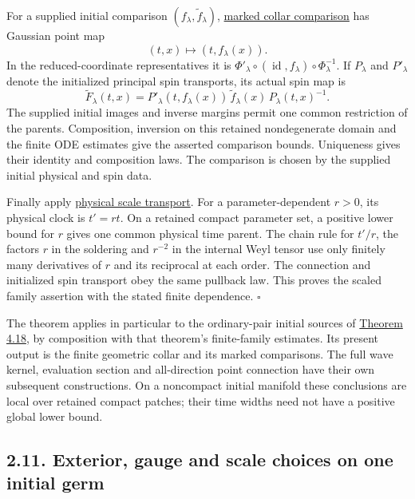 \documentclass[
  english,
  11pt,
  reqno]{amsart}
\begin{document}
For a supplied initial comparison \((f_\lambda,\widetilde f_\lambda)\),
\hyperref[thm:online-marked-collar-full-hom]{marked collar comparison}
has Gaussian point map \[
(t,x)\longmapsto(t,f_\lambda(x)).
\] In the reduced-coordinate representatives it is
\(\Phi'_\lambda\circ(\operatorname{id},f_\lambda)\circ\Phi_\lambda^{-1}\).
If \(P_\lambda\) and \(P'_\lambda\) denote the initialized principal
spin transports, its actual spin map is%
 \[
\widetilde F_\lambda(t,x)
=P'_\lambda(t,f_\lambda(x))\,
\widetilde f_\lambda(x)\,
P_\lambda(t,x)^{-1}.
\] The supplied initial images and inverse margins permit one common
restriction of the parents. Composition, inversion on this retained
nondegenerate domain and the finite ODE estimates give the asserted
comparison bounds. Uniqueness gives their identity and composition laws.
The comparison is chosen by the supplied initial physical and spin data.

Finally apply \hyperref[prop:online-cartan-physical-scale]{physical
scale transport}. For a parameter-dependent \(r>0\), its physical clock
is \(t'=rt\). On a retained compact parameter set, a positive lower
bound for \(r\) gives one common physical time parent. The chain rule
for \(t'/r\), the factors \(r\) in the soldering and \(r^{-2}\) in the
internal Weyl tensor use only finitely many derivatives of \(r\) and its
reciprocal at each order. The connection and initialized spin transport
obey the same pullback law. This proves the scaled family assertion with
the stated finite dependence. \hfill\(\square\)

The theorem applies in particular to the ordinary-pair initial sources
of
\hyperref[thm:online-ordinary-negative-response-initial-source]{Theorem
4.18}, by composition with that theorem's finite-family estimates. Its
present output is the finite geometric collar and its marked
comparisons. The full wave kernel, evaluation section and all-direction
point connection have their own subsequent constructions. On a
noncompact initial manifold these conclusions are local over retained
compact patches; their time widths need not have a positive global lower
bound.

\subsection{2.11. Exterior, gauge and scale choices on one initial
germ}\label{exterior-gauge-and-scale-choices-on-one-initial-germ}\label{sec:online-fixed-slice-geometric-choices}
\end{document}
